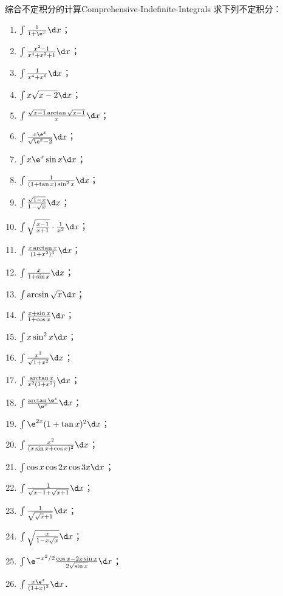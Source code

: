 \begin{problem}{综合不定积分的计算}{Comprehensive-Indefinite-Integrals}
    求下列不定积分：
    \begin{enumerate}
        \item $\int \frac{1}{1 + \e^x} \d x$；
        \item $\int \frac{x^2 - 1}{x^4 + x^2 + 1} \d x$；
        \item $\int \frac{1}{x^4 + x^6} \d x$；
        \item $\int x\sqrt{x - 2} \d x$；
        \item $\int \frac{\sqrt{x - 1} \arctan \sqrt{x - 1}}{x} \d x$；
        \item $\int \frac{x\e^x}{\sqrt{\e^x - 2}} \d x$；
        \item $\int x \e^x \sin x \d x$；
        \item $\int \frac{1}{(1 + \tan x)\sin^2 x} \d x$；
        \item $\int \frac{\sqrt{1 - x}}{1 - \sqrt{x}} \d x$；
        \item $\int \sqrt{\frac{x - 1}{x + 1}} \cdot \frac{1}{x^2} \d x$；
        \item $\int \frac{x \arctan x}{(1 + x^2)^3} \d x$；
        \item $\int \frac{x}{1 + \sin x} \d x$；
        \item $\int \arcsin \sqrt{x} \d x$；
        \item $\int \frac{x + \sin x}{1 + \cos x} \d x$；
        \item $\int x \sin^2 x \d x$；
        \item $\int \frac{x^3}{\sqrt{1 + x^2}} \d x$；
        \item $\int \frac{\arctan x}{x^2(1 + x^2)} \d x$；
        \item $\int \frac{\arctan \e^x}{\e^x} \d x$；
        \item $\int \e^{2x}(1 + \tan x)^2 \d x$；
        \item $\int \frac{x^2}{(x\sin x + \cos x)^2} \d x$；
        \item $\int \cos x \cos 2x \cos 3x \d x$；
        \item $\int \frac{1}{\sqrt{x - 1} + \sqrt{x + 1}} \d x$；
        \item $\int \frac{1}{\sqrt{\sqrt{x} + 1}} \d x$；
        \item $\int \sqrt{\frac{x}{1 - x\sqrt{x}}} \d x$；
        \item $\int \e^{-x^2/2} \frac{\cos x - 2x \sin x}{2\sqrt{\sin x}} \d x$；
        \item $\int \frac{x\e^x}{(1 + x)^2} \d x$．
    \end{enumerate}
\end{problem}

